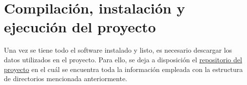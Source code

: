 \paragraph{}
\paragraph{}
\paragraph{}
\paragraph{}
\paragraph{}
\paragraph{}
\paragraph{}
\paragraph{}
\paragraph{}
\paragraph{}
\paragraph{}
\paragraph{}
\paragraph{}

\section{Compilación, instalación y ejecución del proyecto}
Una vez se tiene todo el software instalado y listo, es necesario descargar los datos utilizados en el proyecto. Para ello, se deja a disposición el \href{https://github.com/hds1001/Estudio-y-configuracion-de-un-sistema-ELK}{repositorio del proyecto} en el cuál se encuentra toda la información empleada con la estructura de directorios mencionada anteriormente.

